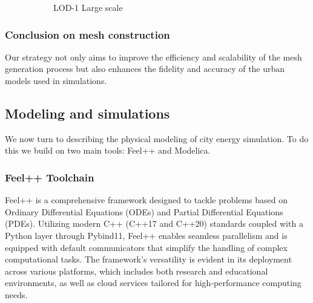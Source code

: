 \documentclass[runningheads]{llncs}
\begin{document}
\begin{figure}[htbp]
\begin{subfigure}{.4\textwidth}
  \caption{LOD-1 Large scale}
  \label{fig:city-ny-largescale}
\end{subfigure}
\caption{}
\label{fig:partitioning}
\end{figure}

\subsubsection{Conclusion on mesh construction}
Our strategy not only aims to improve the efficiency and scalability of the mesh generation process but also enhances the fidelity and accuracy of the urban models used in simulations.

\subsection{Modeling and simulations}

We now turn to describing the physical modeling of  city energy simulation.
To do this we build on two main tools: Feel++ and Modelica. 

\subsubsection{Feel++ Toolchain}

Feel++ is a comprehensive framework designed to tackle problems based on Ordinary Differential Equations (ODEs) and Partial Differential Equations (PDEs). Utilizing modern C++ (C++17 and C++20) standards coupled with a Python layer through Pybind11, Feel++ enables seamless parallelism and is equipped with default communicators that simplify the handling of complex computational tasks. The framework's versatility is evident in its deployment across various platforms, which includes both research and educational environments, as well as cloud services tailored for high-performance computing needs.
\end{document}
